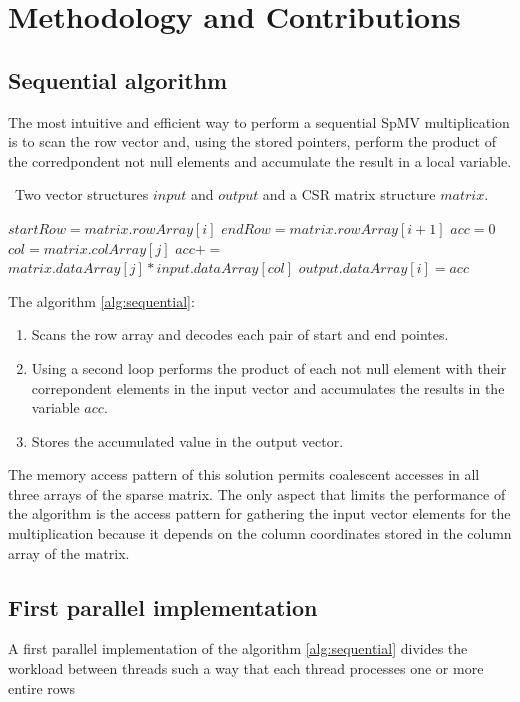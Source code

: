\documentclass[conference]{IEEEtran}
\begin{document}
\section{Methodology and Contributions}\label{sec:methodology}
\subsection{Sequential algorithm}
The most intuitive and efficient way to perform a sequential SpMV multiplication is to scan the row vector and, using the 
stored pointers, perform the product of the corredpondent not null elements and accumulate the result in a local variable.

\begin{algorithm}[h!]
\caption{Sequential version for the SpVM algorithm}
\algorithmicrequire~Two vector structures $input$ and $output$ and a CSR matrix structure $matrix$.
\begin{algorithmic}[1]
\State $startRow=matrix.rowArray[i]$
\State $endRow=matrix.rowArray[i+1]$
\State $acc=0$
\State $col=matrix.colArray[j]$
\State $acc+=$
\State $matrix.dataArray[j]*input.dataArray[col]$
\EndFor
\State $output.dataArray[i]=acc$
\EndFor
\EndProcedure
\end{algorithmic}
\label{alg:sequential}
\end{algorithm}
The algorithm \ref{alg:sequential}:
\begin{enumerate}
    \item Scans the row array and decodes each pair of start and end pointes.
    \item Using a second loop performs the product of each not null element with their correpondent elements in the input vector and accumulates the results in the variable $acc$.
    \item Stores the accumulated value in the output vector.
\end{enumerate}
The memory access pattern of this solution permits coalescent accesses in all three arrays of the sparse matrix. 
The only aspect that limits the performance of the algorithm is the access pattern for gathering the input vector elements for the multiplication
because it depends on the column coordinates stored in the column array of the matrix. 

\subsection{First parallel implementation}
A first parallel implementation of the algorithm \ref{alg:sequential} divides the workload between threads such a way that each thread processes one or more entire rows
\end{document}
